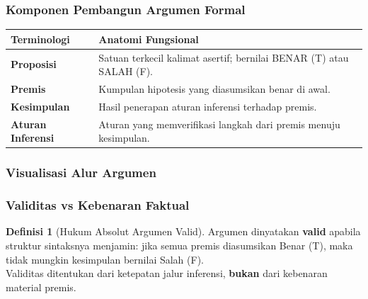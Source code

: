 \documentclass[handout]{beamer}
\theoremstyle{definition}
\newtheorem{definisi}[theorem]{Definisi}
\theoremstyle{example}
\begin{document}
\begin{frame}
\frametitle{Komponen Pembangun Argumen Formal}
\begin{table}
\small
\begin{tabular}{|l|p{8cm}|}
\hline
\textbf{Terminologi} & \textbf{Anatomi Fungsional} \\
\hline
\textbf{Proposisi} & Satuan terkecil kalimat asertif; bernilai BENAR (T) atau SALAH (F). \\
\hline
\textbf{Premis} & Kumpulan hipotesis yang diasumsikan benar di awal. \\
\hline
\textbf{Kesimpulan} & Hasil penerapan aturan inferensi terhadap premis. \\
\hline
\textbf{Aturan Inferensi} & Aturan yang memverifikasi langkah dari premis menuju kesimpulan. \\
\hline
\end{tabular}
\end{table}
\end{frame}

\begin{frame}
\frametitle{Visualisasi Alur Argumen}
\begin{center}
\end{center}
\end{frame}

\begin{frame}
\frametitle{Validitas vs Kebenaran Faktual}
\begin{definisi}[Hukum Absolut Argumen Valid]
Argumen dinyatakan \textbf{valid} apabila struktur sintaksnya menjamin: jika semua premis diasumsikan Benar (T), maka tidak mungkin kesimpulan bernilai Salah (F).\\
Validitas ditentukan dari ketepatan jalur inferensi, \textbf{bukan} dari kebenaran material premis.
\end{definisi}
\end{frame}
\end{document}
